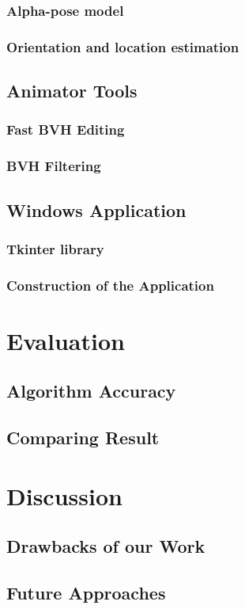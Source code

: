 \documentclass[12pt,oneside,a4paper,english]{article}
\begin{document}
\subsubsection{Alpha-pose model}
\subsubsection{Orientation and location estimation}
\subsection{Animator Tools}
\subsubsection{Fast BVH Editing}
\subsubsection{BVH Filtering}
\subsection{Windows Application}
\subsubsection{Tkinter library}
\subsubsection{Construction of the Application }
\newpage
\section{Evaluation}
\subsection{Algorithm Accuracy}
\subsection{Comparing Result}
\newpage
\section{Discussion}
\subsection{Drawbacks of our Work}
\subsection{Future Approaches}
\newpage
 
%  

\label{EndOfText}

\label{endOfDoc}
\end{document}
